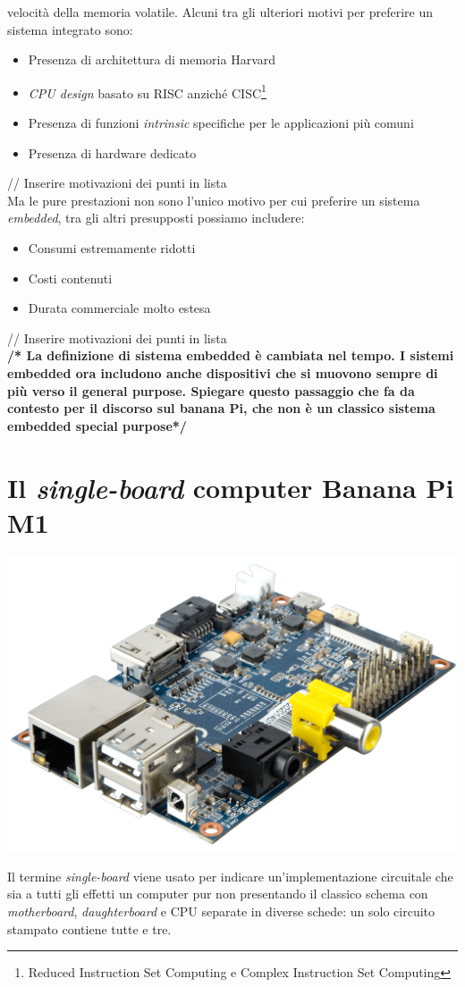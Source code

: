 velocità della memoria volatile.
Alcuni tra gli ulteriori  motivi per preferire un sistema integrato sono:
\begin{itemize}
\item Presenza di architettura di memoria Harvard
\item \emph{CPU design} basato su RISC anziché CISC\footnote{Reduced 
Instruction Set Computing e Complex Instruction Set Computing}
\item Presenza di funzioni \emph{intrinsic} specifiche per le applicazioni più 
comuni
\item Presenza di hardware dedicato
\end{itemize}
// Inserire motivazioni dei punti in lista \\
Ma le pure prestazioni non sono l'unico motivo per cui preferire un sistema 
\emph{embedded}, tra gli altri presupposti possiamo includere:
\begin{itemize}
\item Consumi estremamente ridotti
\item Costi contenuti
\item Durata commerciale molto estesa
\end{itemize}
// Inserire motivazioni dei punti in lista
\\ \textbf{/* La definizione di sistema embedded è cambiata nel tempo. I 
sistemi 
embedded ora includono anche dispositivi che si muovono sempre di più verso il 
general purpose. Spiegare questo passaggio che fa da contesto per il discorso 
sul banana Pi, che non è un classico sistema embedded special purpose*/}
\newpage
\section{Il \emph{single-board} computer Banana Pi M1}
\begin{center}
\includegraphics[scale=0.175]{Figures/bananapi.png}\\
\end{center}
Il termine \emph{single-board} viene usato per indicare un'implementazione 
circuitale che sia a tutti gli effetti un computer pur non presentando il 
classico schema con \emph{motherboard}, \emph{daughterboard} e CPU separate in 
diverse schede: un solo circuito stampato contiene tutte e tre.

